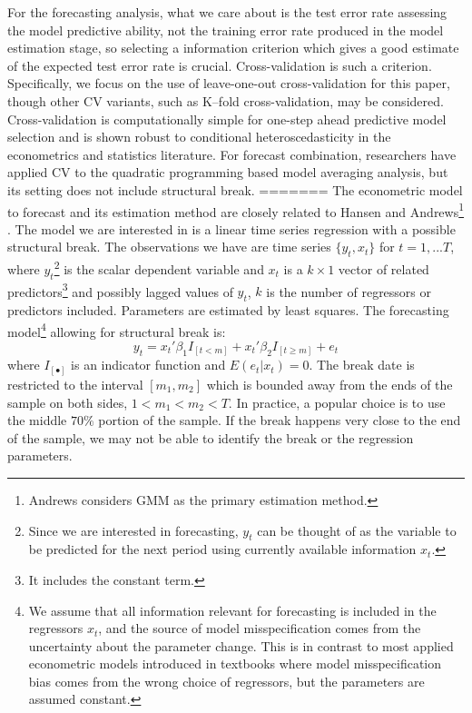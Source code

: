 For the forecasting analysis, what we care about is the test error rate assessing the model predictive ability, not the training error rate produced in the model estimation stage, so selecting a information criterion which gives a good estimate of the expected test error rate is crucial. Cross-validation is such a criterion. Specifically, we focus on the use of leave-one-out cross-validation for this paper, though other CV variants, such as K--fold cross-validation, may be considered. Cross-validation is computationally simple for one-step ahead predictive model selection and is shown robust to conditional heteroscedasticity in the econometrics and statistics literature. For forecast combination, researchers have applied CV to the quadratic programming based model averaging analysis, but its setting does not include structural break.
=======
The econometric model to forecast and its estimation method are closely related to Hansen \cite{hansen2009averaging} and Andrews\footnote{Andrews considers GMM as the primary estimation method.} \cite{andrews93}. The model we are interested in is a linear time series regression with a possible structural break. The observations we have are time series $\{y_t,x_t\}$ for $t = 1,...T$, where $y_t$\footnote{Since we are interested in forecasting, $y_t$ can be thought of as the variable to be predicted for the next period using currently available information $x_t$.} is the scalar dependent variable and $x_t$ is a $k\times 1$ vector of related predictors\footnote{It includes the constant term.} and possibly lagged values of $y_t$, $k$ is the number of regressors or predictors included. Parameters are estimated by least squares. The forecasting model\footnote{We assume that all information relevant for forecasting is included in the regressors $x_t$, and the source of model misspecification comes from the uncertainty about the parameter change. This is in contrast to most applied econometric models introduced in textbooks where model misspecification bias comes from the wrong choice of regressors, but the parameters are assumed constant.} allowing for structural break is:
\begin{equation}
	y_t = x_t'\beta_1 I_{[t<m]} + x_t'\beta_2 I_{[t \geq m]} + e_t
\end{equation}
where $I_{[\bullet]}$ is an indicator function and $E(e_t|x_t) = 0$. The break date is restricted to the interval $[m_1,m_2]$ which is bounded away from the ends of the sample on both sides, $1 < m_{1} < m_{2} < T$. In practice, a popular choice is to use the middle $70\%$ portion of the sample. If the break happens very close to the end of the sample, we may not be able to identify the break or the regression parameters.

